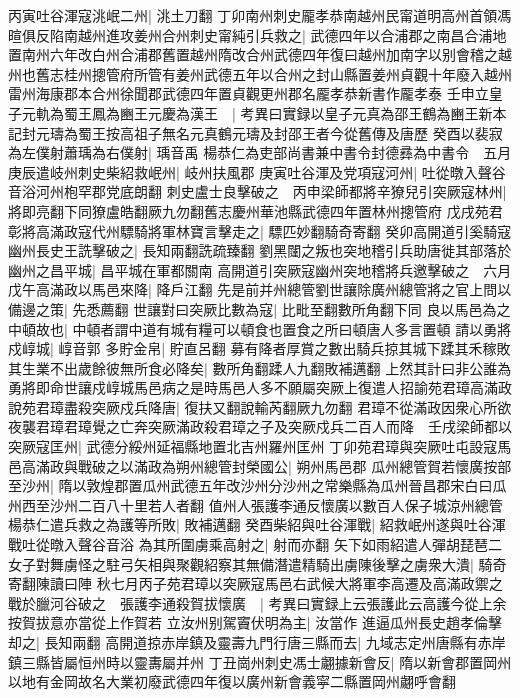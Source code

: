 丙寅吐谷渾寇洮岷二州|{
	洮土刀翻}
丁卯南州刺史龎孝恭南越州民甯道明高州首領馮暄俱反陷南越州進攻姜州合州刺史甯純引兵救之|{
	武德四年以合浦郡之南昌合浦地置南州六年改白州合浦郡舊置越州隋改合州武德四年復曰越州加南字以别會稽之越州也舊志桂州摠管府所管有姜州武德五年以合州之封山縣置姜州貞觀十年廢入越州雷州海康郡本合州徐聞郡武德四年置貞觀更州郡名龎孝恭新書作龎孝泰}
壬申立皇子元軌為蜀王鳳為豳王元慶為漢王　|{
	考異曰實録以皇子元真為邵王鶴為豳王新本記封元璹為蜀王按高祖子無名元真鶴元璹及封邵王者今從舊傳及唐歷}
癸酉以裴寂為左僕射蕭瑀為右僕射|{
	瑀音禹}
楊恭仁為吏部尚書兼中書令封德彞為中書令　五月庚辰遣岐州刺史柴紹救岷州|{
	岐州扶風郡}
庚寅吐谷渾及党項寇河州|{
	吐從暾入聲谷音浴河州枹罕郡党底朗翻}
刺史盧士良擊破之　丙申梁師都將辛獠兒引突厥寇林州|{
	將即亮翻下同獠盧皓翻厥九勿翻舊志慶州華池縣武德四年置林州摠管府}
戊戌苑君彰將高滿政寇代州驃騎將軍林寶言擊走之|{
	驃匹妙翻騎奇寄翻}
癸卯高開道引奚騎寇幽州長史王詵擊破之|{
	長知兩翻詵疏臻翻}
劉黑闥之叛也突地稽引兵助唐徙其部落於幽州之昌平城|{
	昌平城在軍都關南}
高開道引突厥寇幽州突地稽將兵邀擊破之　六月戊午高滿政以馬邑來降|{
	降戶江翻}
先是前并州總管劉世讓除廣州總管將之官上問以備邊之策|{
	先悉薦翻}
世讓對曰突厥比數為寇|{
	比毗至翻數所角翻下同}
良以馬邑為之中頓故也|{
	中頓者謂中道有城有糧可以頓食也置食之所曰頓唐人多言置頓}
請以勇將戍崞城|{
	崞音郭}
多貯金帛|{
	貯直呂翻}
募有降者厚賞之數出騎兵掠其城下蹂其禾稼敗其生業不出歲餘彼無所食必降矣|{
	數所角翻蹂人九翻敗補邁翻}
上然其計曰非公誰為勇將即命世讓戍崞城馬邑病之是時馬邑人多不願屬突厥上復遣人招諭苑君璋高滿政說苑君璋盡殺突厥戍兵降唐|{
	復扶又翻說輸芮翻厥九勿翻}
君璋不從滿政因衆心所欲夜襲君璋君璋覺之亡奔突厥滿政殺君璋之子及突厥戍兵二百人而降　壬戌梁師都以突厥寇匡州|{
	武德分綏州延福縣地置北吉州羅州匡州}
丁卯苑君璋與突厥吐屯設寇馬邑高滿政與戰破之以滿政為朔州總管封榮國公|{
	朔州馬邑郡}
瓜州總管賀若懷廣按部至沙州|{
	隋以敦煌郡置瓜州武德五年改沙州分沙州之常樂縣為瓜州晉昌郡宋白曰瓜州西至沙州二百八十里若人者翻}
值州人張護李通反懷廣以數百人保子城涼州總管楊恭仁遣兵救之為護等所敗|{
	敗補邁翻}
癸酉柴紹與吐谷渾戰|{
	紹救岷州遂與吐谷渾戰吐從暾入聲谷音浴}
為其所圍虜乘高射之|{
	射而亦翻}
矢下如雨紹遣人彈胡琵琶二女子對舞虜怪之駐弓矢相與聚觀紹察其無備潛遣精騎出虜陳後擊之虜衆大潰|{
	騎奇寄翻陳讀曰陣}
秋七月丙子苑君璋以突厥寇馬邑右武候大將軍李高遷及高滿政禦之戰於臘河谷破之　張護李通殺賀拔懷廣　|{
	考異曰實録上云張護此云高護今從上余按賀拔意亦當從上作賀若}
立汝州别駕竇伏明為主|{
	汝當作}
進逼瓜州長史趙孝倫擊却之|{
	長知兩翻}
高開道掠赤岸鎮及靈壽九門行唐三縣而去|{
	九域志定州唐縣有赤岸鎮三縣皆屬恒州時以靈夀屬并州}
丁丑崗州刺史馮士翽據新會反|{
	隋以新會郡置岡州以地有金岡故名大業初廢武德四年復以廣州新會義寜二縣置岡州翽呼會翻}
